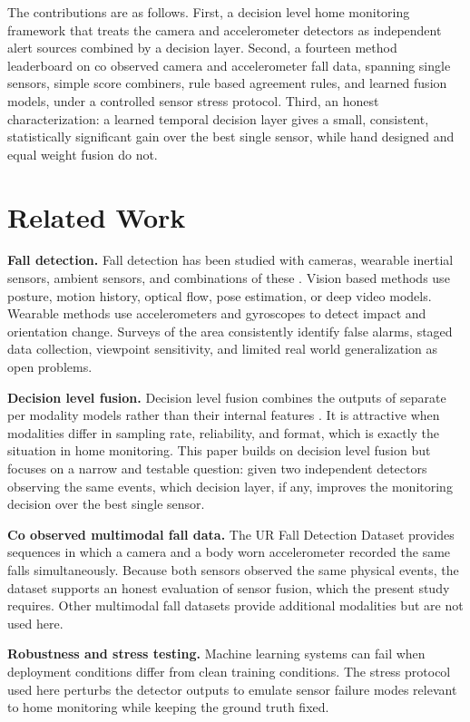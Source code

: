 \documentclass[conference]{IEEEtran}
\begin{document}
The contributions are as follows. First, a decision level home monitoring
framework that treats the camera and accelerometer detectors as independent
alert sources combined by a decision layer. Second, a fourteen method
leaderboard on co observed camera and accelerometer fall data, spanning single
sensors, simple score combiners, rule based agreement rules, and learned fusion
models, under a controlled sensor stress protocol. Third, an honest
characterization: a learned temporal decision layer gives a small, consistent,
statistically significant gain over the best single sensor, while hand designed
and equal weight fusion do not.

\section{Related Work}
\textbf{Fall detection.} Fall detection has been studied with cameras, wearable
inertial sensors, ambient sensors, and combinations of these
\cite{mubashir2013,rougier2007,nunez2017}. Vision based methods use posture,
motion history, optical flow, pose estimation, or deep video models. Wearable
methods use accelerometers and gyroscopes to detect impact and orientation
change. Surveys of the area consistently identify false alarms, staged data
collection, viewpoint sensitivity, and limited real world generalization as open
problems.

\textbf{Decision level fusion.} Decision level fusion combines the outputs of
separate per modality models rather than their internal features
\cite{baltrusaitis2019,atrey2010,dietterich2000}. It is attractive when
modalities differ in sampling rate, reliability, and format, which is exactly the
situation in home monitoring. This paper builds on decision level fusion but
focuses on a narrow and testable question: given two independent detectors
observing the same events, which decision layer, if any, improves the monitoring
decision over the best single sensor.

\textbf{Co observed multimodal fall data.} The UR Fall Detection Dataset
\cite{kwolek2014,kepski2018} provides sequences in which a camera and a body
worn accelerometer recorded the same falls simultaneously. Because both sensors
observed the same physical events, the dataset supports an honest evaluation of
sensor fusion, which the present study requires. Other multimodal fall datasets
\cite{martinez2019} provide additional modalities but are not used here.

\textbf{Robustness and stress testing.} Machine learning systems can fail when
deployment conditions differ from clean training conditions. The stress protocol
used here perturbs the detector outputs to emulate sensor failure modes relevant
to home monitoring while keeping the ground truth fixed.
\end{document}
